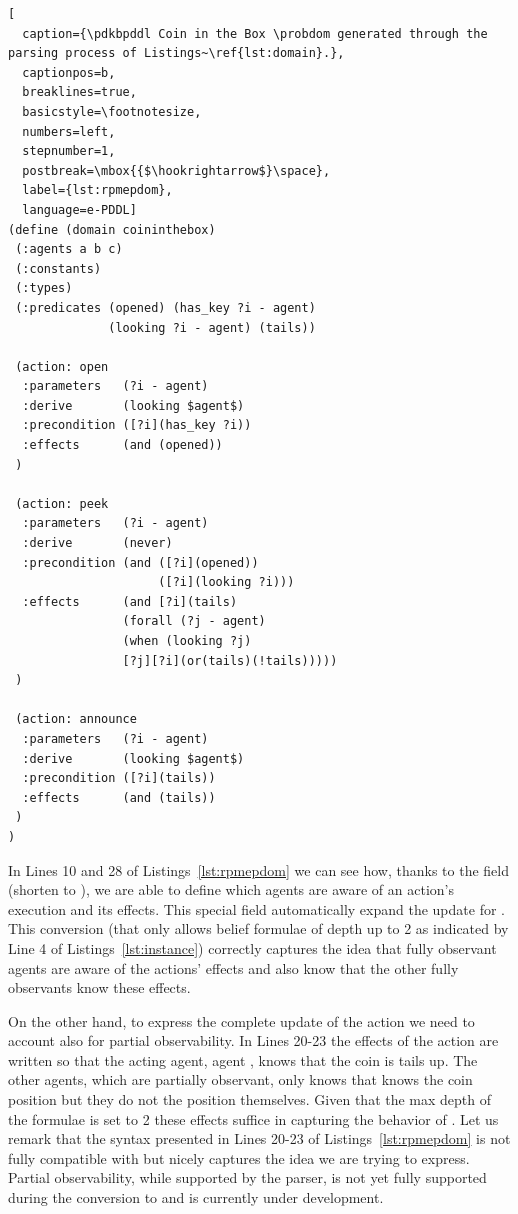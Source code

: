 \begin{lstlisting}[
  caption={\pdkbpddl Coin in the Box \probdom generated through the parsing process of Listings~\ref{lst:domain}.},
  captionpos=b,
  breaklines=true,
  basicstyle=\footnotesize,
  numbers=left,
  stepnumber=1,
  postbreak=\mbox{{$\hookrightarrow$}\space},
  label={lst:rpmepdom},
  language=e-PDDL]
(define (domain coininthebox)
 (:agents a b c)
 (:constants)
 (:types)
 (:predicates (opened) (has_key ?i - agent)
              (looking ?i - agent) (tails))

 (action: open
  :parameters	(?i - agent)
  :derive       (looking $agent$)
  :precondition ([?i](has_key ?i))
  :effects      (and (opened))
 )

 (action: peek
  :parameters	(?i - agent)
  :derive       (never)
  :precondition (and ([?i](opened))
                     ([?i](looking ?i)))
  :effects      (and [?i](tails)
                (forall (?j - agent)
                (when (looking ?j)
                [?j][?i](or(tails)(!tails)))))
 )

 (action: announce
  :parameters	(?i - agent)
  :derive       (looking $agent$)
  :precondition ([?i](tails))
  :effects      (and (tails))
 )
)
\end{lstlisting}

In Lines 10 and 28 of Listings~\ref{lst:rpmepdom} we can see how, thanks to the \pdkbpddl field  (shorten to ), we are able to define which agents are aware of an action's execution and its effects. This special field automatically expand the \knobel update for \rpmep.
This conversion (that only allows belief formulae of depth up to 2 as indicated by Line 4 of Listings~\ref{lst:instance}) correctly captures the idea that fully observant agents are aware of the actions' effects and also know that the other fully observants know these effects.

On the other hand, to express the complete \knobel update of the action  we need to account also for partial observability.
In Lines 20-23 the effects of the action are written so that the acting agent, \ie agent , knows that the coin is tails up.
The other agents, which are partially observant, only knows that  knows the coin position but they do not the position themselves.
Given that the max depth of the formulae is set to 2 these effects suffice in capturing the behavior of .
Let us remark that the syntax presented in Lines 20-23 of Listings~\ref{lst:rpmepdom} is not fully compatible with \pdkbpddl but nicely captures the idea we are trying to express.
Partial observability, while supported by the parser, is not yet fully supported during the conversion to \pdkbpddl and is currently under development.

